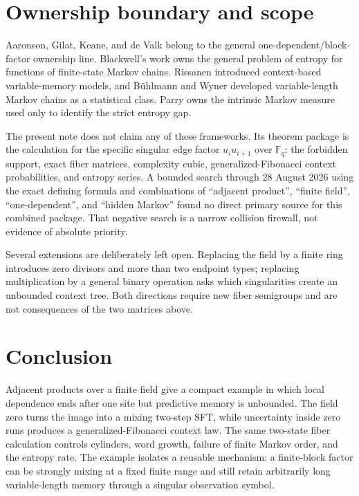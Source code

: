 \documentclass[11pt,a4paper]{amsart}
\theoremstyle{definition}
\theoremstyle{remark}
\newcommand{\F}{\mathbb F}
\begin{document}
\section{Ownership boundary and scope}
\label{sec:ownership}

Aaronson, Gilat, Keane, and de Valk \cite{AaronsonEtAl1989} belong to the
general one-dependent/block-factor ownership line.  Blackwell's work
\cite{Blackwell1957} owns the general problem of entropy for functions of
finite-state Markov chains.  Rissanen
\cite{Rissanen1983} introduced context-based variable-memory models, and
B\"uhlmann and Wyner \cite{BuhlmannWyner1999} developed variable-length
Markov chains as a statistical class.  Parry \cite{Parry1964} owns the
intrinsic Markov measure used only to identify the strict entropy gap.

The present note does not claim any of these frameworks.  Its theorem
package is the calculation for the specific singular edge factor
$u_i u_{i+1}$ over $\F_q$: the forbidden support, exact fiber matrices,
complexity cubic, generalized-Fibonacci context probabilities, and entropy
series.  A bounded search through 28 August 2026 using the exact defining
formula and combinations of ``adjacent product'', ``finite field'',
``one-dependent'', and ``hidden Markov'' found no direct primary source for
this combined package.  That negative search is a narrow collision firewall,
not evidence of absolute priority.

Several extensions are deliberately left open.  Replacing the field by a
finite ring introduces zero divisors and more than two endpoint types;
replacing multiplication by a general binary operation asks which
singularities create an unbounded context tree.  Both directions require new
fiber semigroups and are not consequences of the two matrices above.

\section{Conclusion}

Adjacent products over a finite field give a compact example in which local
dependence ends after one site but predictive memory is unbounded.  The
field zero turns the image into a mixing two-step SFT, while uncertainty
inside zero runs produces a generalized-Fibonacci context law.  The same
two-state fiber calculation controls cylinders, word growth, failure of
finite Markov order, and the entropy rate.  The example isolates a reusable
mechanism: a finite-block factor can be strongly mixing at a fixed finite
range and still retain arbitrarily long variable-length memory through a
singular observation symbol.



\end{document}
